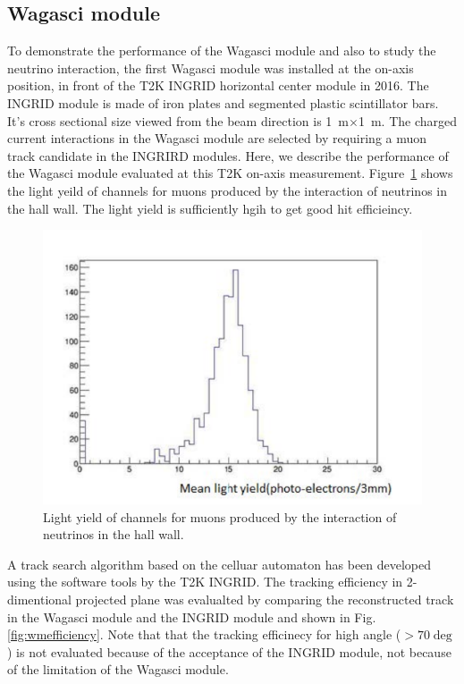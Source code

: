 \subsection{Wagasci module}
To demonstrate the performance of the Wagasci module and also to study the neutrino interaction,
the first Wagasci module was installed at the on-axis position, in front of the T2K INGRID horizontal center module
in 2016.
The INGRID module is made of iron plates and segmented plastic scintillator bars.
It's cross sectional size viewed from the beam direction is 1~m$\times$1~m.
The charged current interactions in the Wagasci module are selected by requiring a muon track candidate
in the INGRIRD modules.
Here, we describe the performance of the Wagasci module evaluated at this T2K on-axis measurement.
Figure~\ref{fig:wmlight} shows the light yeild of channels for muons produced by the interaction of neutrinos
in the hall wall.
The light yield is sufficiently hgih to get good hit efficieincy.  
\begin{figure}[tbh]
\begin{center}
\includegraphics[width=0.5\linewidth]{fig/wmlight.pdf}
\end{center}
\caption{Light yield of channels for muons produced by the interaction of neutrinos
  in the hall wall.
}
\label{fig:wmlight}
\end{figure}
A track search algorithm based on the celluar automaton has been developed using the software tools by the T2K INGRID. 
The tracking efficiency in 2-dimentional projected plane was evalualted by comparing the reconstructed track
in the Wagasci module and the INGRID module and shown in Fig.\ref{fig:wmefficiency}.
Note that that the tracking efficinecy for high angle ($>70\deg$) is not evaluated because of the acceptance
of the INGRID module, not because of the limitation of the Wagasci module.
